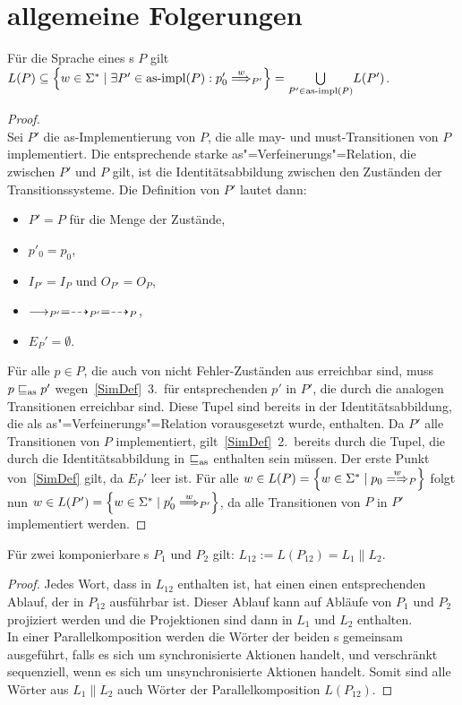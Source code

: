\chapter{allgemeine Folgerungen}

\begin{Prop}
  \label{LImpProp}
  Für die Sprache eines \MEIO{}s $P$ gilt $L(P) \subseteq \left\{w\in
  \Sigma ^* \mid \exists P'\in\asimp (P) : p'_0\weakmust[w]_{P'} \right\} =
  \underset{P'\in\asimp (P)}{\bigcup} L(P')$.
\end{Prop}
\begin{proof}\mbox{}\\
  Sei $P'$ die as-Implementierung von $P$, die alle may-
  und must-Transitionen von $P$ implementiert. Die entsprechende starke
  as"=Verfeinerungs"=Relation, die zwischen $P'$ und $P$ gilt, ist die
  Identitätsabbildung zwischen den Zuständen der Transitionssysteme. Die
  Definition von $P'$ lautet dann:
  \begin{itemize}
    \item $P'=P$ für die Menge der Zustände,
    \item $p'_0=p_0$,
    \item $I_{P'}=I_P$ und $O_{P'}=O_P$,
    \item $\must _{P'} =\may _{P'} = \may _P$,
    \item $E_P'=\emptyset$.
  \end{itemize}
  Für alle $p\in P$, die auch von nicht Fehler-Zuständen aus erreichbar sind,
  muss $p\sqsubseteq _{\mathrm{as}} p'$ wegen~\ref{SimDef}~3.\ für entsprechenden $p'$ in $P'$, die
  durch die analogen Transitionen erreichbar sind. Diese Tupel sind bereits in
  der Identitätsabbildung, die als as"=Verfeinerungs"=Relation vorausgesetzt
  wurde, enthalten. Da $P'$ alle Transitionen von $P$ implementiert,
  gilt~\ref{SimDef}~2.\ bereits durch die Tupel, die durch die
  Identitätsabbildung in $\sqsubseteq _{\mathrm{as}}$ enthalten sein müssen. Der erste Punkt
  von~\ref{SimDef} gilt, da $E_P'$ leer ist. Für alle $w\in L(P) = \left\{w\in
  \Sigma ^* \mid p_0\weakmay[w]_P\right\}$ folgt nun $w\in L(P') = \left\{w\in
  \Sigma ^* \mid p'_0\weakmust[w]_{P'}\right\}$, da alle Transitionen von $P$
  in $P'$ implementiert werden.
\end{proof}

\begin{Prop}
  \label{LParallelProp}
  Für zwei komponierbare \MEIO{}s $P_1$ und $P_2$ gilt: $L_{12} := L(P_{12}) =
  L_1\|L_2$.
\end{Prop}
\begin{proof}
  Jedes Wort, dass in $L_{12}$ enthalten ist, hat einen einen entsprechenden
  Ablauf, der in $P_{12}$ ausführbar ist. Dieser Ablauf kann auf Abläufe von
  $P_1$ und $P_2$ projiziert werden und die Projektionen sind dann in $L_1$ und
  $L_2$ enthalten.\\
  In einer Parallelkomposition werden die Wörter der beiden \MEIO{}s gemeinsam
  ausgeführt, falls es sich um synchronisierte Aktionen handelt, und
  verschränkt sequenziell, wenn es sich um unsynchronisierte Aktionen handelt.
  Somit sind alle Wörter aus $L_1\|L_2$ auch Wörter der Parallelkomposition
  $L(P_{12})$.
\end{proof}

